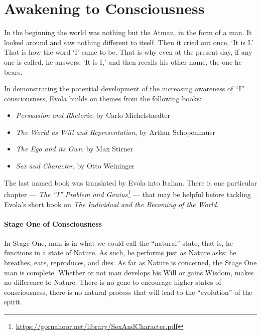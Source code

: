 \section{Awakening to Consciousness}

\begin{quotex}
In the beginning the world was nothing but the Atman, in the form of a man. It looked around and saw nothing different to itself. Then it cried out once, `It is I.' That is how the word `I' came to be. That is why even at the present day, if any one is called, he answers, `It is I,' and then recalls his other name, the one he bears.
\end{quotex}


In demonstrating the potential development of the increasing awareness of ``I'' consciousness, Evola builds on themes from the following books:

\begin{itemize}


\item \emph{Persuasion and Rhetoric}, by Carlo Michelstaedter


\item \emph{The World as Will and Representation}, by Arthur Schopenhauer


\item \emph{The Ego and its Own}, by Max Stirner


\item \emph{Sex and Character}, by Otto Weininger

\end{itemize}


The last named book was translated by Evola into Italian. There is one particular chapter --- \emph{The ``I'' Problem and Genius\footnote{\url{https://gornahoor.net/library/SexAndCharacter.pdf}}} --- that may be helpful before tackling Evola's short book on \emph{The Individual and the Becoming of the World}.

\paragraph{Stage One of Consciousness}


In Stage One, man is in what we could call the ``natural'' state, that is, he functions in a state of Nature. As such, he performs just as Nature asks: he breathes, eats, reproduces, and dies. As far as Nature is concerned, the Stage One man is complete. Whether or not man develops his Will or gains Wisdom, makes no difference to Nature. There is no gene to encourage higher states of consciousness, there is no natural process that will lead to the ``evolution'' of the spirit.


